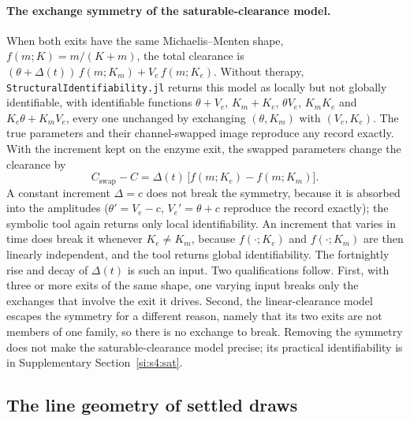 \paragraph{The exchange symmetry of the saturable-clearance model.} When both exits have the
same Michaelis--Menten shape, $f(m;K)=m/(K+m)$, the total clearance is
$(\theta+\Delta(t))\,f(m;K_m)+V_e\,f(m;K_e)$. Without therapy,
\texttt{StructuralIdentifiability.jl} returns this model as locally but not globally
identifiable, with identifiable functions $\theta+V_e$, $K_m+K_e$, $\theta V_e$, $K_mK_e$
and $K_e\theta+K_mV_e$, every one unchanged by exchanging $(\theta,K_m)$ with $(V_e,K_e)$.
The true parameters and their channel-swapped image reproduce any record exactly. With the
increment kept on the enzyme exit, the swapped parameters change the clearance by
\begin{equation}
\label{seq:s1-swap}
C_{\mathrm{swap}}-C=\Delta(t)\,\bigl[f(m;K_e)-f(m;K_m)\bigr].
\end{equation}
A constant increment $\Delta=c$ does not break the symmetry, because it is absorbed into
the amplitudes ($\theta'=V_e-c$, $V_e'=\theta+c$ reproduce the record exactly); the symbolic
tool again returns only local identifiability. An increment that varies in time does break
it whenever $K_e\ne K_m$, because $f(\cdot;K_e)$ and $f(\cdot;K_m)$ are then linearly
independent, and the tool returns global identifiability. The fortnightly rise and decay of
$\Delta(t)$ is such an input. Two qualifications follow. First, with three or more exits of
the same shape, one varying input breaks only the exchanges that involve the exit it drives.
Second, the linear-clearance model escapes the symmetry for a different reason, namely that
its two exits are not members of one family, so there is no exchange to break. Removing the symmetry
does not make the saturable-clearance model precise; its practical identifiability is in
Supplementary Section~\ref{si:s4:sat}.

\subsection{The line geometry of settled draws}
\label{si:s1-pencil}

